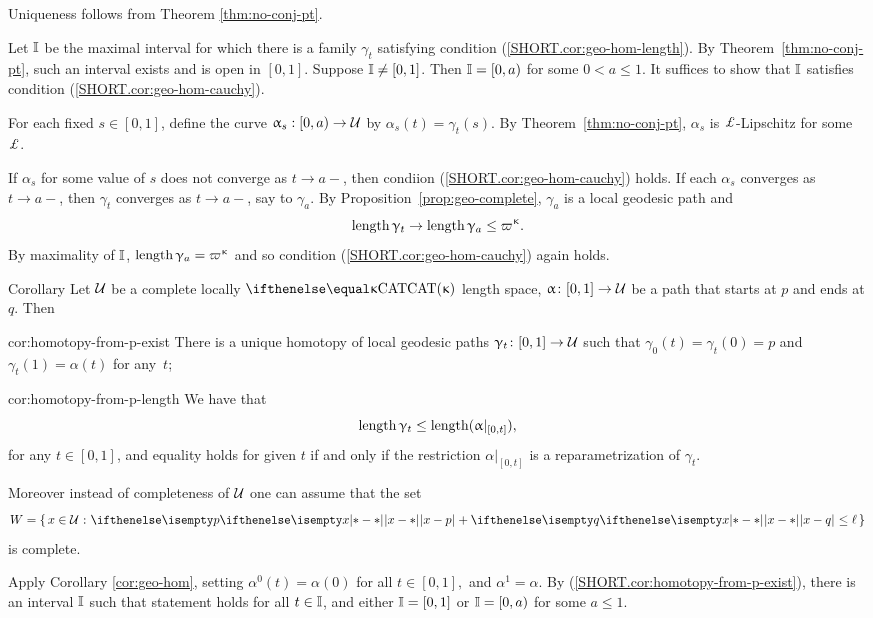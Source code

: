 Uniqueness follows from  Theorem \ref{thm:no-conj-pt}.

Let $\mathbb{I}$ be the maximal interval for which there is a family $\gamma_t$ satisfying condition (\ref{SHORT.cor:geo-hom-length}). 
By Theorem~\ref{thm:no-conj-pt}, such an interval exists and is open in $[0,1]$.  Suppose $\mathbb{I}\ne[0,1]$. Then  $\mathbb{I}=[0,a)$ for some $0<a\le 1$.  It suffices to show that $\mathbb{I}$ satisfies condition (\ref{SHORT.cor:geo-hom-cauchy}).

For each fixed $s\in [0,1]$, define the curve $\alpha_s:[0,a)\to\spc{U}$ by $\alpha_s(t)=\gamma_t(s)$. 
By Theorem~\ref{thm:no-conj-pt}, 
$\alpha_s$ is $ \Lip$-Lipschitz for some $\Lip$.  

If $\alpha_s$  for some value of $s$ does not converge as $t\to a-$, then condiion (\ref{SHORT.cor:geo-hom-cauchy}) holds.  If each $\alpha_s$  converges as $t\to a-$,  
 then $ \gamma_t$ converges as $t\to a-$, say to $\gamma_a$.
By  Proposition~\ref{prop:geo-complete}, $\gamma_a$ is a local geodesic path and\[\length\gamma_t\to\length\gamma_a\le \varpi\kappa.\]
By maximality of $\mathbb{I}$, $\length\gamma_a=\varpi\kappa$ and so condition (\ref{SHORT.cor:geo-hom-cauchy}) again holds.
\qeds

\begin{thm}{Corollary}\label{cor:homotopy-from-p}
Let $\mathcal{U}$ be a complete locally $\CAT\kappa$ length space, 
$\alpha\:[0,1]\to \spc{U}$ be a path that starts at $p$ and ends at $q$.
Then  

\begin{subthm}{cor:homotopy-from-p-exist}
There is a unique homotopy of local geodesic paths $\gamma_t\:[0,1]\to \spc{U}$
such that $\gamma_0(t)=\gamma_t(0)=p$ and $\gamma_t(1)=\alpha(t)$ for any~$t$;
\end{subthm}

\begin{subthm}{cor:homotopy-from-p-length}
We have that
\[\length\gamma_t\le\length(\alpha|_{[0,t]}),\]
for any $t\in[0,1]$, and equality holds for given $t$ if and only if the restriction $\alpha|_{[0,t]}$ is a reparametrization of $\gamma_t$.
\end{subthm}

Moreover instead of completeness of $\mathcal{U}$ one can assume that the set 
\[W=\set{x\in \spc{U}}{\dist{x}{p}{}+\dist{x}{q}{}\le \ell}\] 
is complete.

\end{thm}

Apply Corollary \ref{cor:geo-hom}, setting $\alpha^0(t)=\alpha(0)$ for all $t\in [0,1],$ and $\alpha^1=\alpha$. By (\ref{SHORT.cor:homotopy-from-p-exist}),  there is an interval $\mathbb{I}$ such that statement holds for all $t\in\II$, and either $\mathbb{I}=[0,1]$ or $\mathbb{I}=[0,a)$ for some $a\le 1$.

